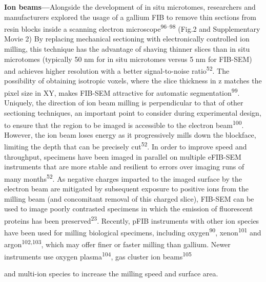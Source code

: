 \documentclass{article}
\begin{document}
\textbf{Ion beams—}Alongside the development of in situ microtomes, researchers and manufacturers explored the usage of a gallium FIB to remove thin sections from resin blocks inside a scanning electron microscope\textsuperscript{96–98} (Fig.2 and Supplementary Movie 2) By replacing mechanical sectioning with electronically controlled ion milling, this technique has the advantage of shaving thinner slices than in situ microtomes (typically 50 nm for in situ microtomes versus 5 nm for FIB-SEM) and achieves higher resolution with a better signal-to-noise ratio\textsuperscript{52}. The possibility of obtaining isotropic voxels, where the slice thickness in z matches the pixel size in XY, makes FIB-SEM attractive for automatic segmentation\textsuperscript{99}. Uniquely, the direction of ion beam milling is perpendicular to that of other sectioning techniques, an important point to consider during experimental design, to ensure that the region to be imaged is accessible to the electron beam\textsuperscript{100}. However, the ion beam loses energy as it progressively mills down the blockface, limiting the depth that can be precisely cut\textsuperscript{52}. In order to improve speed and throughput, specimens have been imaged in parallel on multiple eFIB-SEM instruments that are more stable and resilient to errors over imaging runs of many months\textsuperscript{52}. As negative charges imparted to the imaged surface by the electron beam are mitigated by subsequent exposure to positive ions from the milling beam (and concomitant removal of this charged slice), FIB-SEM can be used to image poorly contrasted specimens in which the emission of fluorescent proteins has been preserved\textsuperscript{23}. Recently, pFIB instruments with other ion species have been used for milling biological specimens, including oxygen\textsuperscript{90}, xenon\textsuperscript{101} and argon\textsuperscript{102,103}, which may offer finer or faster milling than gallium. Newer instruments use oxygen plasma\textsuperscript{104}, gas cluster ion beams\textsuperscript{105}

and multi-ion species to increase the milling speed and surface area.
\end{document}
